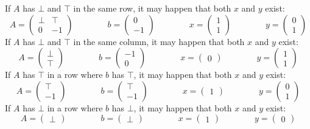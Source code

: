 \documentclass[]{article}
\renewcommand{\.}{\hskip .75pt}
\begin{document}
If $A$ has $\bot$ and $\top$ in the same row, it may happen that both $x$ and $y$ exist:
$$
A =
\begin{pmatrix}
	\bot & \top \\
	0 & -1
\end{pmatrix}
\qquad \qquad
b = \begin{pmatrix} 0 \\ -1 \end{pmatrix}
\qquad \qquad
x = \begin{pmatrix} 1 \\ 1 \end{pmatrix}
\qquad \qquad
y = \begin{pmatrix} 0 \\ 1 \end{pmatrix}
$$
If $A$ has $\bot$ and $\top$ in the same column, it may happen that both $x$ and $y$ exist:
$$
A = \begin{pmatrix} \bot \\ \top \end{pmatrix}
\qquad \qquad
b = \begin{pmatrix} -1 \\ 0 \end{pmatrix}
\qquad \qquad
x = \begin{pmatrix} 0 \end{pmatrix}
\qquad \qquad
y = \begin{pmatrix} 1 \\ 1 \end{pmatrix}
$$
If $A$ has $\top$ in a row where $b$ has $\top$, it may happen that both $x$ and $y$ exist:
$$
A = \begin{pmatrix} \top \\ -1 \end{pmatrix}
\qquad \qquad
b = \begin{pmatrix} \top \\ -1 \end{pmatrix}
\qquad \qquad
x = \begin{pmatrix} 1 \end{pmatrix}
\qquad \qquad
y = \begin{pmatrix} 0 \\ 1 \end{pmatrix}
$$
If $A$ has $\bot$ in a row where $b$ has $\bot$, it may happen that both $x$ and $y$ exist:
$$
A = \begin{pmatrix} \bot \end{pmatrix}
\qquad \qquad
b = \begin{pmatrix} \bot \end{pmatrix}
\qquad \qquad
x = \begin{pmatrix} 1 \end{pmatrix}
\qquad \qquad
y = \begin{pmatrix} 0 \end{pmatrix}
$$
\end{document}
